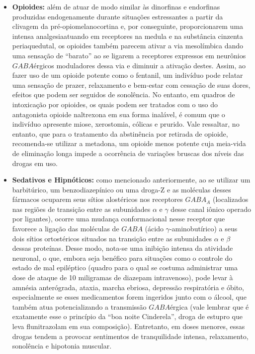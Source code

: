 \documentclass[
]{book}
\theoremstyle{definition}
\theoremstyle{definition}
\theoremstyle{definition}
\theoremstyle{definition}
\theoremstyle{remark}
\begin{document}
\begin{itemize}
\item
  \textbf{Opioides:} além de atuar de modo similar às dinorfinas e endorfinas produzidas endogenamente durante situações estressantes a partir da clivagem da pré-opiomelanocortina e, por conseguinte, proporcionarem uma intensa analgesiaatuando em receptores na medula e na substância cinzenta periaquedutal, os opioides também parecem ativar a via mesolímbica dando uma sensação de ``barato'' ao se ligarem a receptores expressos em neurônios \(GABA\)érgicos moduladores dessa via e diminuir a ativação destes. Assim, ao fazer uso de um opioide potente como o fentanil, um indivíduo pode relatar uma sensação de prazer, relaxamento e bem-estar com cessação de suas dores, efeitos que podem ser seguidos de sonolência. No entanto, em quadros de intoxicação por opioides, os quais podem ser tratados com o uso do antagonista opioide naltrexona em sua forma inalável, é comum que o indivíduo apresente miose, xerostomia, cólicas e prurido. Vale ressaltar, no entanto, que para o tratamento da abstinência por retirada de opioide, recomenda-se utilizar a metadona, um opioide menos potente cuja meia-vida de eliminação longa impede a ocorrência de variações bruscas dos níveis das drogas em uso.
\item
  \textbf{Sedativos e Hipnóticos:} como mencionado anteriormente, ao se utilizar um barbitúrico, um benzodiazepínico ou uma droga-Z e as moléculas desses fármacos ocuparem seus sítios alostéricos nos receptores \(GABA_A\) (localizados nas regiões de transição entre as subunidades \(\alpha\) e \(\gamma\) desse canal iônico operado por ligantes), ocorre uma mudança conformacional nesse receptor que favorece a ligação das moléculas de \(GABA\) (ácido \(\gamma\)-aminobutírico) a seus dois sítios ortostéricos situados na transição entre as subunidades \(\alpha\) e \(\beta\) dessas proteínas. Desse modo, nota-se uma inibição intensa da atividade neuronal, o que, embora seja benéfico para situações como o controle do estado de mal epiléptico (quadro para o qual se costuma administrar uma dose de ataque de 10 miligramas de diazepam intravenoso), pode levar à amnésia anterógrada, ataxia, marcha ebriosa, depressão respiratória e óbito, especialmente se esses medicamentos forem ingeridos junto com o álcool, que também atua potencializando a transmissão \(GABA\)érgica (vale lembrar que é exatamente esse o princípio da ``boa noite Cinderela'', droga de estupro que leva flunitrazolam em sua composição). Entretanto, em doses menores, essas drogas tendem a provocar sentimentos de tranquilidade intensa, relaxamento, sonolência e hipotonia muscular.

\end{itemize}
\end{document}
